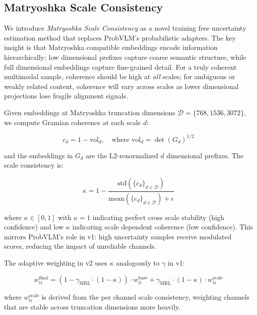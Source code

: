 \documentclass[a4paper,fleqn]{cas-sc}
\begin{document}
\begin{itemize}
\subsection{Matryoshka Scale Consistency}\label{sec:v2-matryoshka}

We introduce \emph{Matryoshka Scale Consistency} as a novel training free uncertainty estimation method that replaces ProbVLM's probabilistic adapters. The key insight is that Matryoshka compatible embeddings encode information hierarchically: low dimensional prefixes capture coarse semantic structure, while full dimensional embeddings capture fine-grained detail. For a truly coherent multimodal sample, coherence should be high at \emph{all} scales; for ambiguous or weakly related content, coherence will vary across scales as lower dimensional projections lose fragile alignment signals.

Given embeddings at Matryoshka truncation dimensions $\mathcal{D} = \{768,  1536,  3072\}$, we compute Gramian coherence at each scale $d$:

\begin{equation}\label{eq:v2-scale-coherence}
c_d = 1 - \mathrm{vol}_d, \quad \text{where } \mathrm{vol}_d = \det(G_d)^{1/2}
\end{equation}

and the embeddings in $G_d$ are the L2-renormalized $d$ dimensional prefixes. The scale consistency is:

\begin{equation}\label{eq:v2-kappa}
\kappa = 1 - \frac{\mathrm{std}(\{c_d\}_{d \in \mathcal{D}})}{\mathrm{mean}(\{c_d\}_{d \in \mathcal{D}}) + \epsilon}
\end{equation}

where $\kappa \in [0, 1]$ with $\kappa = 1$ indicating perfect cross scale stability (high confidence) and low $\kappa$ indicating scale dependent coherence (low confidence). This mirrors ProbVLM's role in v1: high uncertainty samples receive modulated scores, reducing the impact of unreliable channels.

The adaptive weighting in v2 uses $\kappa$ analogously to $\gamma$ in v1:

\begin{equation}\label{eq:v2-adaptive}
w_{ti}^{\mathrm{final}} = (1 - \gamma_{\mathrm{MRL}} \cdot (1 - \kappa)) \cdot w_{ti}^{\mathrm{base}} + \gamma_{\mathrm{MRL}} \cdot (1 - \kappa) \cdot w_{ti}^{\mathrm{scale}}
\end{equation}

where $w_{ti}^{\mathrm{scale}}$ is derived from the per channel scale consistency, weighting channels that are stable across truncation dimensions more heavily.


\end{itemize}
\end{document}

